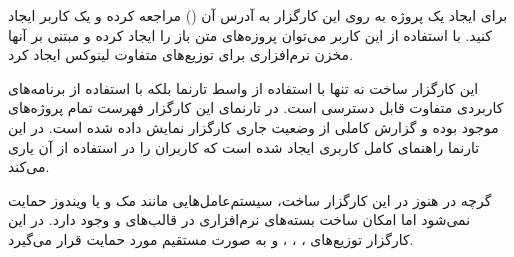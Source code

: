 %


برای ایجاد یک پروژه به روی این کارگزار به آدرس آن ()
مراجعه کرده و یک  کاربر ایجاد کنید. با استفاده از این کاربر می‌توان پروزه‌های متن باز را ایجاد کرده و
مبتنی بر آنها مخزن نرم‌افزاری برای توزیع‌های متفاوت لینوکس ایجاد کرد.

این کارگزار ساخت نه تنها با استفاده از واسط تارنما بلکه با استفاده از برنامه‌های
کاربردی متفاوت قابل دسترسی است. در تارنمای این کارگزار فهرست تمام پروژه‌های
موجود بوده و گزارش کاملی از وضعیت جاری کارگزار نمایش داده شده است. در این تارنما
راهنمای کامل کاربری ایجاد شده است که کاربران را در استفاده از آن یاری می‌کند.


%
%
%



گرچه در هنوز در این کارگزار ساخت، سیستم‌عامل‌هایی مانند مک و
یا ویندوز حمایت نمی‌شود اما امکان ساخت بسته‌های نرم‌افزاری در قالب‌های
 و  وجود دارد. در این
کارگزار توزیع‌های ، ، ،  و
 به صورت مستقیم مورد حمایت قرار می‌گیرد.


%

